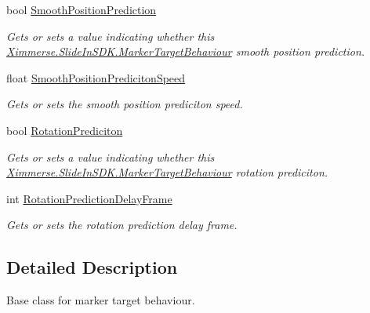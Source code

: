 \begin{DoxyCompactItemize}
bool \mbox{\hyperlink{class_ximmerse_1_1_slide_in_s_d_k_1_1_marker_target_behaviour_ad7e7222c2b9ff3b79eaaf3fc298b16a8}{Smooth\+Position\+Prediction}}
\begin{DoxyCompactList}\small\item\em Gets or sets a value indicating whether this \mbox{\hyperlink{class_ximmerse_1_1_slide_in_s_d_k_1_1_marker_target_behaviour}{Ximmerse.\+Slide\+In\+S\+D\+K.\+Marker\+Target\+Behaviour}} smooth position prediction. \end{DoxyCompactList}\item 
float \mbox{\hyperlink{class_ximmerse_1_1_slide_in_s_d_k_1_1_marker_target_behaviour_adf57dfdc0553493646eab330d0ca646f}{Smooth\+Position\+Prediciton\+Speed}}
\begin{DoxyCompactList}\small\item\em Gets or sets the smooth position prediciton speed. \end{DoxyCompactList}\item 
bool \mbox{\hyperlink{class_ximmerse_1_1_slide_in_s_d_k_1_1_marker_target_behaviour_ab8c4b9b3daf70720060bf7c2b7fc6456}{Rotation\+Prediciton}}
\begin{DoxyCompactList}\small\item\em Gets or sets a value indicating whether this \mbox{\hyperlink{class_ximmerse_1_1_slide_in_s_d_k_1_1_marker_target_behaviour}{Ximmerse.\+Slide\+In\+S\+D\+K.\+Marker\+Target\+Behaviour}} rotation prediciton. \end{DoxyCompactList}\item 
int \mbox{\hyperlink{class_ximmerse_1_1_slide_in_s_d_k_1_1_marker_target_behaviour_add8ca3e0762fa077416f1f3aaa00b287}{Rotation\+Prediction\+Delay\+Frame}}
\begin{DoxyCompactList}\small\item\em Gets or sets the rotation prediction delay frame. \end{DoxyCompactList}\end{DoxyCompactItemize}


\subsection{Detailed Description}
Base class for marker target behaviour. 



